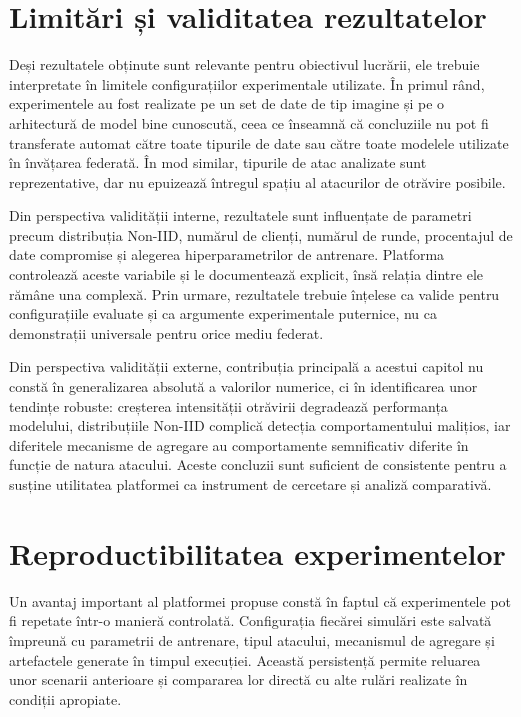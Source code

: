 \documentclass[../../main.tex]{subfiles}
\begin{document}
    \section{Limitări și validitatea rezultatelor}

        Deși rezultatele obținute sunt relevante pentru obiectivul lucrării, ele trebuie interpretate în limitele configurațiilor experimentale utilizate. În primul rând, experimentele au fost realizate pe un set de date de tip imagine și pe o arhitectură de model bine cunoscută, ceea ce înseamnă că concluziile nu pot fi transferate automat către toate tipurile de date sau către toate modelele utilizate în învățarea federată. În mod similar, tipurile de atac analizate sunt reprezentative, dar nu epuizează întregul spațiu al atacurilor de otrăvire posibile.

        Din perspectiva validității interne, rezultatele sunt influențate de parametri precum distribuția Non-IID, numărul de clienți, numărul de runde, procentajul de date compromise și alegerea hiperparametrilor de antrenare. Platforma controlează aceste variabile și le documentează explicit, însă relația dintre ele rămâne una complexă. Prin urmare, rezultatele trebuie înțelese ca valide pentru configurațiile evaluate și ca argumente experimentale puternice, nu ca demonstrații universale pentru orice mediu federat.

        Din perspectiva validității externe, contribuția principală a acestui capitol nu constă în generalizarea absolută a valorilor numerice, ci în identificarea unor tendințe robuste: creșterea intensității otrăvirii degradează performanța modelului, distribuțiile Non-IID complică detecția comportamentului malițios, iar diferitele mecanisme de agregare au comportamente semnificativ diferite în funcție de natura atacului. Aceste concluzii sunt suficient de consistente pentru a susține utilitatea platformei ca instrument de cercetare și analiză comparativă.

    \section{Reproductibilitatea experimentelor}

        Un avantaj important al platformei propuse constă în faptul că experimentele pot fi repetate într-o manieră controlată. Configurația fiecărei simulări este salvată împreună cu parametrii de antrenare, tipul atacului, mecanismul de agregare și artefactele generate în timpul execuției. Această persistență permite reluarea unor scenarii anterioare și compararea lor directă cu alte rulări realizate în condiții apropiate.
\end{document}
